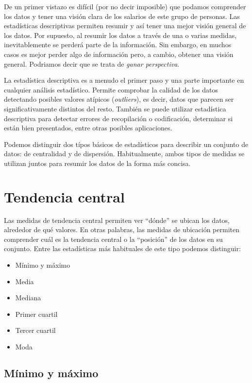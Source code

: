 \documentclass[
]{book}
\providecommand{\tightlist}{%
  \setlength{\itemsep}{0pt}\setlength{\parskip}{0pt}}
\begin{document}
De un primer vistazo es difícil (por no decir imposible) que podamos comprender los datos y tener una visión clara de los salarios de este grupo de personas. Las estadísticas descriptivas permiten resumir y así tener una mejor visión general de los datos. Por supuesto, al resumir los datos a través de una o varias medidas, inevitablemente se perderá parte de la información. Sin embargo, en muchos casos es mejor perder algo de información pero, a cambio, obtener una visión general. Podriamos decir que se trata de \emph{ganar perspectiva}.

La estadística descriptiva es a menudo el primer paso y una parte importante en cualquier análisis estadístico. Permite comprobar la calidad de los datos detectando posibles valores atípicos (\emph{outliers}), es decir, datos que parecen ser significativamente distintos del resto. También se puede utilizar estadística descriptiva para detectar errores de recopilación o codificación, determinar si están bien presentados, entre otras posibles aplicaciones.

Podemos distinguir dos típos básicos de estadísticos para describir un conjunto de datos: de centralidad y de dispersión. Habitualmente, ambos tipos de medidas se utilizan juntos para resumir los datos de la forma más concisa.

\hypertarget{tendencia-central}{%
\section{Tendencia central}\label{tendencia-central}}

Las medidas de tendencia central permiten ver ``dónde'' se ubican los datos, alrededor de qué valores. En otras palabras, las medidas de ubicación permiten comprender cuál es la tendencia central o la ``posición'' de los datos en su conjunto. Entre las estadísticas más habituales de este tipo podemos distinguir:

\begin{itemize}
\tightlist
\item
  Mínimo y máximo
\item
  Media
\item
  Mediana
\item
  Primer cuartil
\item
  Tercer cuartil
\item
  Moda
\end{itemize}

\hypertarget{muxednimo-y-muxe1ximo}{%
\subsection{Mínimo y máximo}\label{muxednimo-y-muxe1ximo}}
\end{document}
